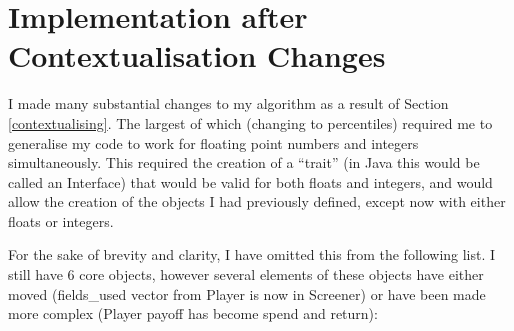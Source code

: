 \section{Implementation after Contextualisation Changes}
I made many substantial changes to my algorithm as a result of Section \ref{contextualising}. The largest of which (changing to percentiles) required me to generalise my code to work for floating point numbers and integers simultaneously. This required the creation of a ``trait'' (in Java this would be called an Interface) that would be valid for both floats and integers, and would allow the creation of the objects I had previously defined, except now with either floats or integers. \newline

For the sake of brevity and clarity, I have omitted this from the following list. I still have 6 core objects, however several elements of these objects have either moved (fields\_used vector from Player is now in Screener) or have been made more complex (Player payoff has become spend and return):

